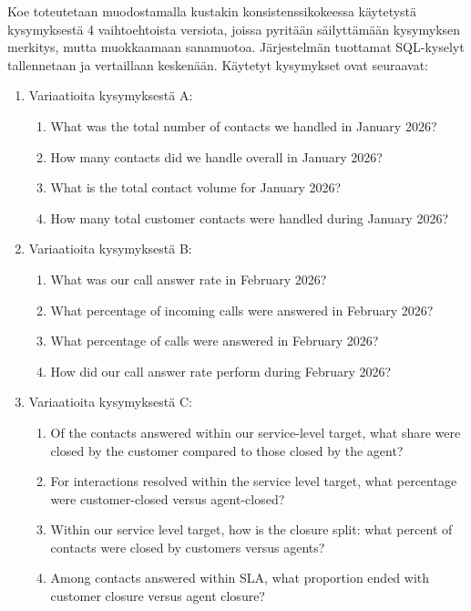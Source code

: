 Koe toteutetaan muodostamalla kustakin konsistenssikokeessa käytetystä kysymyksestä 4 vaihtoehtoista versiota, joissa pyritään säilyttämään kysymyksen merkitys, mutta muokkaamaan sanamuotoa. Järjestelmän tuottamat SQL-kyselyt tallennetaan ja vertaillaan keskenään. Käytetyt kysymykset ovat seuraavat:
\begin{enumerate}[label=\Alph*.]
    \label{it:q_sensitivity}
  \item Variaatioita kysymyksestä A:
    \begin{enumerate}[label=\arabic*.]
      \item What was the total number of contacts we handled in January 2026?
      \item How many contacts did we handle overall in January 2026?
      \item What is the total contact volume for January 2026?
      \item How many total customer contacts were handled during January 2026?
    \end{enumerate}
  \item Variaatioita kysymyksestä B:
    \begin{enumerate}[label=\arabic*.]
      \item What was our call answer rate in February 2026?
      \item What percentage of incoming calls were answered in February 2026?
      \item What percentage of calls were answered in February 2026?
      \item How did our call answer rate perform during February 2026?
    \end{enumerate}
  \item Variaatioita kysymyksestä C:
    \begin{enumerate}[label=\arabic*.]
      \item Of the contacts answered within our service-level target, what share were closed by the customer compared to those closed by the agent?
      \item For interactions resolved within the service level target, what percentage were customer-closed versus agent-closed?
      \item Within our service level target, how is the closure split: what percent of contacts were closed by customers versus agents?
      \item Among contacts answered within SLA, what proportion ended with customer closure versus agent closure?
    \end{enumerate}

\end{enumerate}
